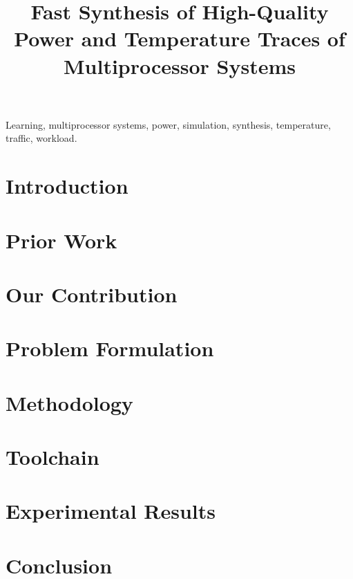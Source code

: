 \documentclass[conference]{IEEEtran}
\title{
  Fast Synthesis of High-Quality Power and Temperature Traces of
  Multiprocessor Systems
}
\author{}
\begin{document}
  \maketitle

  \begin{abstract}
    
  \end{abstract}

  \begin{IEEEkeywords}
    Learning,
    multiprocessor systems,
    power,
    simulation,
    synthesis,
    temperature,
    traffic,
    workload.
  \end{IEEEkeywords}


  \section{Introduction} 
  

  \section{Prior Work}

  \section{Our Contribution} 
  

  \section{Problem Formulation} 
  

  \section{Methodology} 
  

  \section{Toolchain} 
  

  \section{Experimental Results} 
  

  \section{Conclusion} 
  

  \begingroup
    
    
  \endgroup
\end{document}

